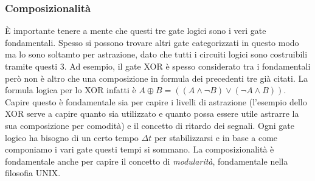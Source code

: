 \subsubsection{Composizionalità}
È importante tenere a mente che questi tre gate logici sono i veri gate fondamentali. Spesso si possono trovare altri gate categorizzati in questo modo ma lo sono soltamto per astrazione, dato che tutti i circuiti logici sono costruibili tramite questi 3. Ad esempio, il gate XOR è spesso considerato tra i fondamentali però non è altro che una composizione in formula dei precedenti tre già citati. La formula logica per lo XOR infatti è $A \oplus B = ( (A \land \lnot B) \lor (\lnot A \land B) )$.
Capire questo è fondamentale sia per capire i livelli di astrazione (l'esempio dello XOR serve a capire quanto sia utilizzato e quanto possa essere utile astrarre la sua composizione per comodità) e il concetto di ritardo dei segnali. Ogni gate logico ha bisogno di un certo tempo $\Delta t$ per stabilizzarsi e in base a come componiamo i vari gate questi tempi si sommano.
La composizionalità è fondamentale anche per capire il concetto di \textit{modularità}, fondamentale nella filosofia UNIX.
